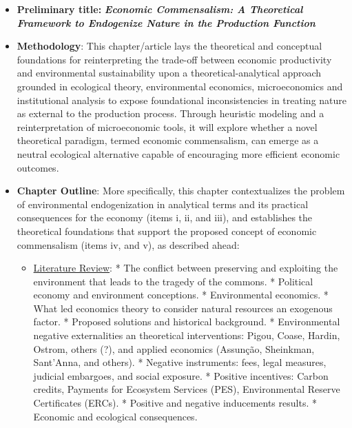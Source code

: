 \begin{itemize}

    \item \textbf{Preliminary title:} \emph{\textbf{Economic Commensalism: A Theoretical Framework to Endogenize Nature in the Production Function}}
    
    \item \textbf{Methodology}: This chapter/article lays the theoretical and conceptual foundations for reinterpreting the trade-off between economic productivity and environmental sustainability upon a theoretical-analytical approach grounded in ecological theory, environmental economics, microeconomics and institutional analysis to expose foundational inconsistencies in treating nature as external to the production process. Through heuristic modeling and a reinterpretation of microeconomic tools, it will explore whether a novel theoretical paradigm, termed economic commensalism, can emerge as a neutral ecological alternative capable of encouraging more efficient economic outcomes. 
    
    \item \textbf{Chapter Outline}: More specifically, this chapter contextualizes the problem of environmental endogenization in analytical terms and its practical consequences for the economy (items i, ii, and iii), and establishes the theoretical foundations that support the proposed concept of economic commensalism (items iv, and v), as described ahead:
        
        \begin{itemize}
            
            \item[i.] \underline{Literature Review}: * The conflict between preserving and exploiting the environment that leads to the tragedy of the commons. * Political economy and environment conceptions. * Environmental economics. * What led economics theory to consider natural resources an exogenous factor. * Proposed solutions and historical background. * Environmental negative externalities an theoretical interventions: Pigou, Coase, Hardin, Ostrom, others (?), and applied economics (Assunção, Sheinkman, Sant'Anna, and others). * Negative instruments: fees, legal measures, judicial embargoes, and social exposure. * Positive incentives: Carbon credits, Payments for Ecosystem Services (PES), Environmental Reserve Certificates (ERCs). * Positive and negative inducements results. * Economic and ecological consequences.
            

\end{itemize}
\end{itemize}
